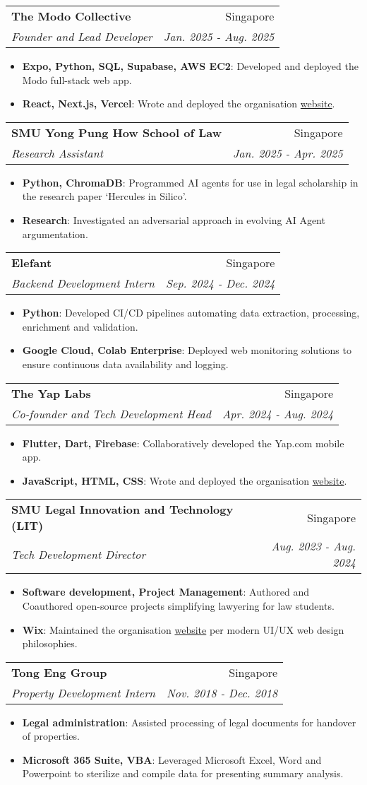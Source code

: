 \documentclass[letterpaper,11pt]{article}
\makeatletter
\newcommand{\resumeItem}[2]{
  \item\small{
    \textbf{#1}{: #2 \vspace{-2pt}}
  }
}
\newcommand{\resumeSubheading}[4]{
  \vspace{-1pt}\item
    \begin{tabular*}{0.97\textwidth}{l@{\extracolsep{\fill}}r}
      \textbf{#1} & #2 \\
      \textit{\small#3} & \textit{\small #4} \\
    \end{tabular*}\vspace{-5pt}
}
\newcommand{\resumeItemListStart}{\begin{itemize}}
\newcommand{\resumeItemListEnd}{\end{itemize}\vspace{-5pt}}
\makeatother
\begin{document}
    \resumeSubheading
      {The Modo Collective}{Singapore}
      {Founder and Lead Developer}{Jan. 2025 - Aug. 2025}
      \resumeItemListStart
        \resumeItem{Expo, Python, SQL, Supabase, AWS EC2}
          {Developed and deployed the Modo full-stack web app.}
        \resumeItem{React, Next.js, Vercel}
          {Wrote and deployed the organisation \href{https://modo-com.vercel.app/}{website}.}
      \resumeItemListEnd

    \resumeSubheading
      {SMU Yong Pung How School of Law}{Singapore}
      {Research Assistant}{Jan. 2025 - Apr. 2025}
      \resumeItemListStart
        \resumeItem{Python, ChromaDB}
          {Programmed AI agents for use in legal scholarship in the research paper \lq{Hercules in Silico}\rq.}
        \resumeItem{Research}
          {Investigated an adversarial approach in evolving AI Agent argumentation.}
      \resumeItemListEnd

    \resumeSubheading
      {Elefant}{Singapore}
      {Backend Development Intern}{Sep. 2024 - Dec. 2024}
      \resumeItemListStart
        \resumeItem{Python}
          {Developed CI/CD pipelines automating data extraction, processing, enrichment and validation.}
        \resumeItem{Google Cloud, Colab Enterprise}
          {Deployed web monitoring solutions to ensure continuous data availability and logging.}
      \resumeItemListEnd

    \resumeSubheading
      {The Yap Labs}{Singapore}
      {Co-founder and Tech Development Head}{Apr. 2024 - Aug. 2024}
      \resumeItemListStart
        \resumeItem{Flutter, Dart, Firebase}
          {Collaboratively developed the Yap.com mobile app.}
        \resumeItem{JavaScript, HTML, CSS}
          {Wrote and deployed the organisation \href{https://the-yap-labs.github.io/}{website}.}
      \resumeItemListEnd

    \resumeSubheading
      {SMU Legal Innovation and Technology (LIT)}{Singapore}
      {Tech Development Director}{Aug. 2023 - Aug. 2024}
      \resumeItemListStart
        \resumeItem{Software development, Project Management}
          {Authored and Coauthored open-source projects simplifying lawyering for law students.}
        \resumeItem{Wix}
          {Maintained the organisation \href{https://www.smulit.org/}{website} per modern UI/UX web design philosophies.}
      \resumeItemListEnd

    \resumeSubheading
      {Tong Eng Group}{Singapore}
      {Property Development Intern}{Nov. 2018 - Dec. 2018}
      \resumeItemListStart
        \resumeItem{Legal administration}
          {Assisted processing of legal documents for handover of properties.}
        \resumeItem{Microsoft 365 Suite, VBA}
          {Leveraged Microsoft Excel, Word and Powerpoint to sterilize and compile data for presenting summary analysis.}
      \resumeItemListEnd
\end{document}
